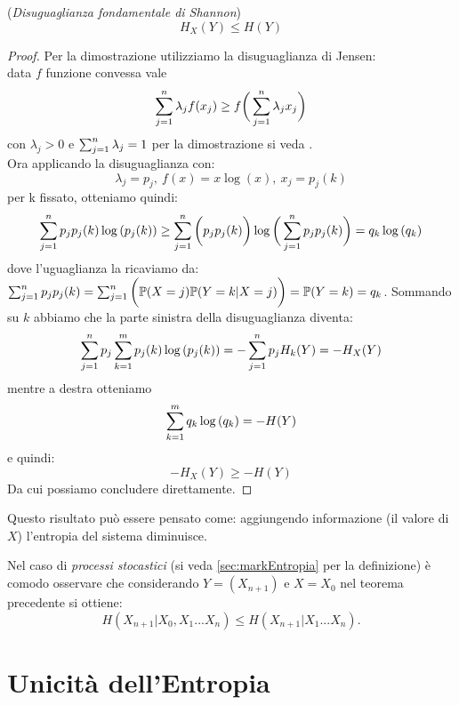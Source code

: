 \begin{teo} \label{teo:disugShannon}
(\textit{Disuguaglianza fondamentale di Shannon})\\
\begin{equation}
H_X(Y)\leq H(Y)
\end{equation}
\end{teo}
\begin{proof}
Per la dimostrazione utilizziamo la disuguaglianza di Jensen:\\
data $f$ funzione convessa vale
\begin{equation}
\sum_{j=1}^n \lambda_j f(x_j)\geq f\bigg( \sum_{j=1}^n \lambda_j x_j \bigg)
\end{equation}
con $\lambda_j > 0$ e $\sum_{j=1}^n \lambda_j =1$
per la dimostrazione si veda \cite{Jensen}.\\
Ora applicando la disuguaglianza con:
$$\lambda_j=p_j,\ f(x)=x \log { (x)}, \  x_j=p_j(k)$$
per k fissato, otteniamo quindi:
$$\sum_{j=1}^n p_j p_j(k)\log {(p_j(k))}\geq \sum_{j=1}^n \bigg( p_j p_j(k) \bigg) \log { \bigg( \sum_{j=1}^np_j p_j(k) \bigg) }=q_k \log {(q_k)}$$
dove l'uguaglianza la ricaviamo da: $\sum_{j=1}^n p_j p_j(k)=\sum_{j=1}^n \bigg( \mathbb{P}(X=j) \mathbb{P}(Y=k|X=j) \bigg)= \mathbb{P}(Y=k)= q_k$.
Sommando su $k$ abbiamo che la parte sinistra della disuguaglianza diventa:
$$\sum_{j=1}^n  p_j \sum_{k=1}^m p_j(k) \log {(p_j(k))}=-\sum_{j=1}^n p_j H_k(Y)=-H_X(Y)$$
mentre a destra otteniamo
$$\sum_{k=1}^m q_k \log { (q_k) }= -H(Y)$$
e quindi:
\begin{equation}
-H_X(Y) \geq -H(Y)
\end{equation}
Da cui possiamo concludere direttamente.
\end{proof}
Questo risultato può essere pensato come: aggiungendo informazione (il valore di $X$) l'entropia del sistema diminuisce.
\begin{oss}\label{oss:disugShannon}
Nel caso di \textit{processi stocastici} (si veda \ref{sec:markEntropia} per la definizione) è comodo osservare che considerando $Y=(X_{n+1})$ e $X=X_0$ nel teorema precedente si ottiene:
$$H(X_{n+1}|X_0,X_1...X_n) \leq H(X_{n+1}|X_1...X_n).$$
\end{oss}
\vspace{15pt}


\section{Unicità dell'Entropia}
\label{sec:UniEntropia}
\vspace{10pt}

